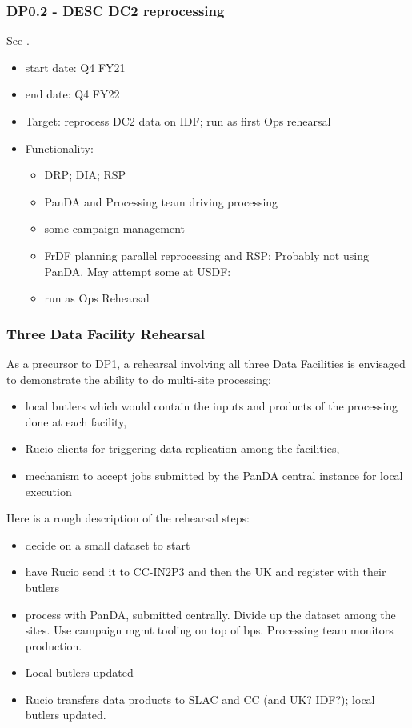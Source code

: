 \subsubsection{ \gls{DP0}.2 - \gls{DESC} DC2 reprocessing}
See .
\begin{itemize}
\item start date: Q4 \gls{FY21}
\item end date: Q4 \gls{FY22}
\item Target: reprocess \gls{DC2} data on \gls{IDF}; run as first Ops rehearsal
\item Functionality:
\begin{itemize}
\item \gls{DRP}; \gls{DIA}; \gls{RSP}
\item \gls{PanDA} and Processing team driving processing
\item some campaign management
\item \gls{FrDF} planning parallel reprocessing and RSP; Probably not using
  \gls{PanDA}. May attempt some at \gls{USDF}:
\item run as Ops Rehearsal
\end{itemize}
\end{itemize}
\subsubsection{ Three Data Facility Rehearsal}
 As a precursor to DP1, a rehearsal involving all three Data
 Facilities is envisaged to demonstrate the ability to do multi-site
 processing:
 \begin{itemize}
\item local butlers which would contain the inputs and products of the processing done at each facility,
\item Rucio clients for triggering data replication among the facilities,
\item mechanism to accept jobs submitted by the PanDA
central instance for local execution
\end{itemize}

Here is a rough description of the rehearsal steps:
\begin{itemize}
\item decide on a small dataset to start
\item have Rucio send it to CC-IN2P3 and then the UK and register with
  their butlers
\item process with PanDA, submitted centrally. Divide up the dataset among the sites. Use campaign mgmt tooling on top of bps. Processing team monitors production.
\item Local butlers updated
\item Rucio transfers data products to SLAC and CC (and UK? IDF?); local butlers updated.
\end{itemize}

